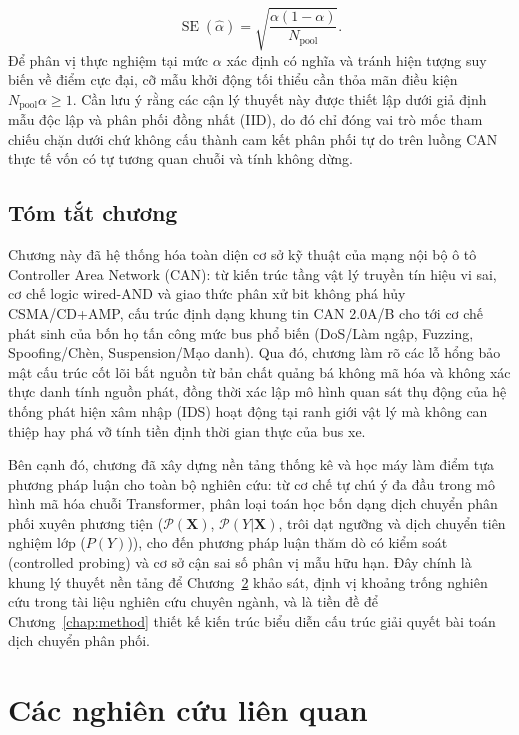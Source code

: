 \documentclass[12pt, a4paper, reqno, oneside]{book}
\begin{document}
\begin{enumerate}
    \begin{equation}\label{eq:binomial-se}
    \operatorname{SE}(\hat{\alpha}) = \sqrt{\frac{\alpha(1-\alpha)}{N_{\text{pool}}}}.
    \end{equation}
    Để phân vị thực nghiệm tại mức $\alpha$ xác định có nghĩa và tránh hiện tượng suy biến về điểm cực đại, cỡ mẫu khởi động tối thiểu cần thỏa mãn điều kiện $N_{\text{pool}}\alpha \ge 1$. Cần lưu ý rằng các cận lý thuyết này được thiết lập dưới giả định mẫu độc lập và phân phối đồng nhất (IID), do đó chỉ đóng vai trò mốc tham chiếu chặn dưới chứ không cấu thành cam kết phân phối tự do trên luồng CAN thực tế vốn có tự tương quan chuỗi và tính không dừng.
\end{enumerate}



\section{Tóm tắt chương}
Chương này đã hệ thống hóa toàn diện cơ sở kỹ thuật của mạng nội bộ ô tô Controller Area Network (CAN): từ kiến trúc tầng vật lý truyền tín hiệu vi sai, cơ chế logic wired-AND và giao thức phân xử bit không phá hủy CSMA/CD+AMP, cấu trúc định dạng khung tin CAN 2.0A/B cho tới cơ chế phát sinh của bốn họ tấn công mức bus phổ biến (DoS/Làm ngập, Fuzzing, Spoofing/Chèn, Suspension/Mạo danh). Qua đó, chương làm rõ các lỗ hổng bảo mật cấu trúc cốt lõi bắt nguồn từ bản chất quảng bá không mã hóa và không xác thực danh tính nguồn phát, đồng thời xác lập mô hình quan sát thụ động của hệ thống phát hiện xâm nhập (IDS) hoạt động tại ranh giới vật lý mà không can thiệp hay phá vỡ tính tiền định thời gian thực của bus xe.

Bên cạnh đó, chương đã xây dựng nền tảng thống kê và học máy làm điểm tựa phương pháp luận cho toàn bộ nghiên cứu: từ cơ chế tự chú ý đa đầu trong mô hình mã hóa chuỗi Transformer, phân loại toán học bốn dạng dịch chuyển phân phối xuyên phương tiện ($\mathcal{P}(\mathbf{X})$, $\mathcal{P}(Y|\mathbf{X})$, trôi dạt ngưỡng và dịch chuyển tiên nghiệm lớp ($P(Y)$)), cho đến phương pháp luận thăm dò có kiểm soát (controlled probing) và cơ sở cận sai số phân vị mẫu hữu hạn. Đây chính là khung lý thuyết nền tảng để Chương~\ref{chap:related} khảo sát, định vị khoảng trống nghiên cứu trong tài liệu nghiên cứu chuyên ngành, và là tiền đề để Chương~\ref{chap:method} thiết kế kiến trúc biểu diễn cấu trúc giải quyết bài toán dịch chuyển phân phối.

\chapter{Các nghiên cứu liên quan}\label{chap:related}
\end{document}
